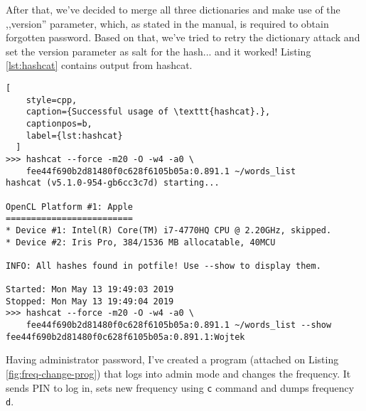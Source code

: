 After that, we've decided to merge all three dictionaries and make use of the ,,version'' parameter, which, as stated in the manual, is required to obtain forgotten password. Based on that, we've tried to retry the dictionary attack and set the version parameter as salt for the hash... and it worked! Listing \ref{lst:hashcat} contains output from hashcat.

\begin{minipage}{\linewidth}
  \begin{lstlisting}[
    style=cpp,
    caption={Successful usage of \texttt{hashcat}.},
    captionpos=b,
    label={lst:hashcat}
  ]
>>> hashcat --force -m20 -O -w4 -a0 \
    fee44f690b2d81480f0c628f6105b05a:0.891.1 ~/words_list
hashcat (v5.1.0-954-gb6cc3c7d) starting...

OpenCL Platform #1: Apple
=========================
* Device #1: Intel(R) Core(TM) i7-4770HQ CPU @ 2.20GHz, skipped.
* Device #2: Iris Pro, 384/1536 MB allocatable, 40MCU

INFO: All hashes found in potfile! Use --show to display them.

Started: Mon May 13 19:49:03 2019
Stopped: Mon May 13 19:49:04 2019
>>> hashcat --force -m20 -O -w4 -a0 \
    fee44f690b2d81480f0c628f6105b05a:0.891.1 ~/words_list --show
fee44f690b2d81480f0c628f6105b05a:0.891.1:Wojtek
  \end{lstlisting}
  \end{minipage}



Having administrator password, I've created a program (attached on Listing \ref{fig:freq-change-prog}) that logs into admin mode and changes the frequency. It sends PIN to log in, sets new frequency using \texttt{c} command and dumps frequency \texttt{d}.

